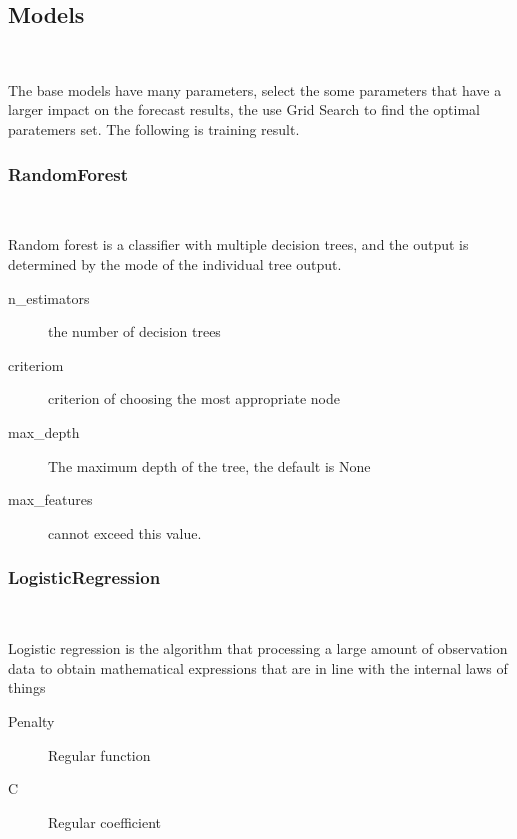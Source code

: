 \subsection{\DIFdelbegin {}\DIFdelend Models}
\

The base models have many parameters,
select the some parameters that 
have a larger impact on 
the forecast results,
the use Grid Search to find 
the optimal paratemers set.	
The following is training result. 
\subsubsection{RandomForest}
\

Random forest is a classifier with 
multiple decision trees, and
the output is determined by 
the mode of the individual tree output.


\begin{description}
	\item[n_estimators] the number of decision trees
	\item[criteriom] criterion of choosing 
	the most appropriate node
	\item[max_depth] The maximum depth of the tree, 
	the default is None 
	\item[max_features] \DIFdelbegin {}\DIFdelend \DIFaddbegin {}\DIFaddend cannot exceed this value.
\end{description}




\subsubsection{LogisticRegression}
\

Logistic regression is the algorithm that 
processing a large amount of 
observation data to 
obtain mathematical expressions 
that are in line with 
the internal laws of things


\begin{description}
	\item[Penalty] Regular function
	\item[C] Regular coefficient
\end{description}




\subsubsection{\DIFdelbegin {}\DIFdelend \DIFaddbegin {}\DIFaddend }
\

